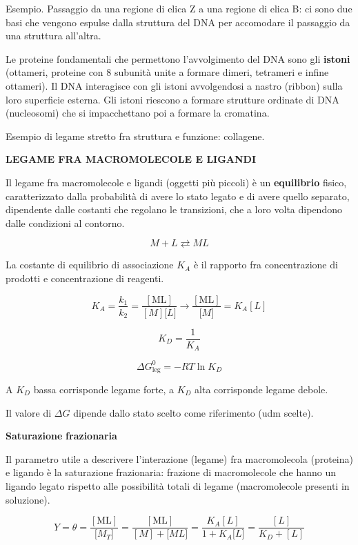Esempio. Passaggio da una regione di elica Z a una regione di elica B:
ci sono due basi che vengono espulse dalla struttura del DNA per
accomodare il passaggio da una struttura all'altra.

Le proteine fondamentali che permettono l'avvolgimento del DNA sono gli
\textbf{istoni} (ottameri, proteine con 8 subunità unite a formare
dimeri, tetrameri e infine ottameri). Il DNA interagisce con gli istoni
avvolgendosi a nastro (ribbon) sulla loro superficie esterna. Gli istoni
riescono a formare strutture ordinate di DNA (nucleosomi) che si
impacchettano poi a formare la cromatina.

Esempio di legame stretto fra struttura e funzione: collagene.

\textbf{LEGAME FRA MACROMOLECOLE E LIGANDI}

Il legame fra macromolecole e ligandi (oggetti più piccoli) è un
\textbf{equilibrio} fisico, caratterizzato dalla probabilità di avere lo
stato legato e di avere quello separato, dipendente dalle costanti che
regolano le transizioni, che a loro volta dipendono dalle condizioni al
contorno.

\[M + L \rightleftarrows ML\]

La costante di equilibrio di associazione \(K_{A}\) è il rapporto fra
concentrazione di prodotti e concentrazione di reagenti.

\[K_{A} = \frac{k_{1}}{k_{2}} = \frac{\left\lbrack \text{ML} \right\rbrack}{\left\lbrack M \right\rbrack\lbrack L\rbrack} \rightarrow \frac{\left\lbrack \text{ML} \right\rbrack}{\lbrack M\rbrack} = K_{A}\left\lbrack L \right\rbrack\]

\[K_{D} = \frac{1}{K_{A}}\]

\[\Delta G_{\text{leg}}^{0} = - RT\ln K_{D}\]

A \(K_{D}\) bassa corrisponde legame forte, a \(K_{D}\) alta corrisponde
legame debole.

Il valore di \(\Delta G\) dipende dallo stato scelto come riferimento
(udm scelte).

\textbf{Saturazione} \textbf{frazionaria}

Il parametro utile a descrivere l'interazione (legame) fra macromolecola
(proteina) e ligando è la saturazione frazionaria: frazione di
macromolecole che hanno un ligando legato rispetto alle possibilità
totali di legame (macromolecole presenti in soluzione).

\[Y = \theta = \frac{\left\lbrack \text{ML} \right\rbrack}{\lbrack M_{T}\rbrack} = \frac{\left\lbrack \text{ML} \right\rbrack}{\left\lbrack M \right\rbrack + \lbrack ML\rbrack} = \frac{K_{A}\left\lbrack L \right\rbrack}{1 + K_{A}\lbrack L\rbrack} = \frac{\left\lbrack L \right\rbrack}{K_{D} + \left\lbrack L \right\rbrack}\]

